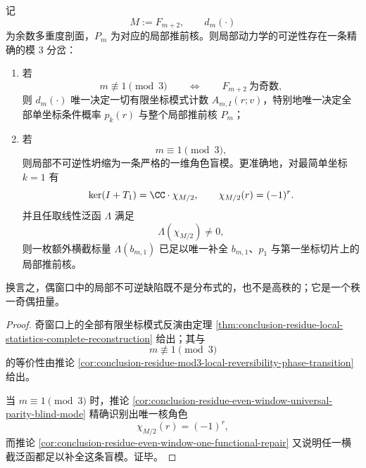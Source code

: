 \begin{theorem}[奇窗口全反演与偶窗口一维奇偶盲模]\label{thm:conclusion-oddwindow-full-inversion-evenwindow-rankone-parity-blindmode}
记
\[
M:=F_{m+2},
\qquad
d_m(\cdot)
\]
为余数多重度剖面，\(P_m\) 为对应的局部推前核。则局部动力学的可逆性存在一条精确的模 \(3\) 分岔：
\begin{enumerate}
  \item 若
  \[
  m\not\equiv 1\pmod 3
  \qquad\Longleftrightarrow\qquad
  F_{m+2}\ \text{为奇数},
  \]
  则 \(d_m(\cdot)\) 唯一决定一切有限坐标模式计数 \(A_{m,I}(r;v)\)，特别地唯一决定全部单坐标条件概率 \(p_k(r)\) 与整个局部推前核 \(P_m\)；
  \item 若
  \[
  m\equiv 1\pmod 3,
  \]
  则局部不可逆性坍缩为一条严格的一维角色盲模。更准确地，对最简单坐标 \(k=1\) 有
  \[
  \ker(I+T_1)=\CC\cdot \chi_{M/2},
  \qquad
  \chi_{M/2}(r)=(-1)^r.
  \]
  并且任取线性泛函 \(\Lambda\) 满足
  \[
  \Lambda(\chi_{M/2})\neq 0,
  \]
  则一枚额外横截标量 \(\Lambda(b_{m,1})\) 已足以唯一补全 \(b_{m,1}\)、\(p_1\) 与第一坐标切片上的局部推前核。
\end{enumerate}
换言之，偶窗口中的局部不可逆缺陷既不是分布式的，也不是高秩的；它是一个秩一奇偶扭量。
\end{theorem}
\begin{proof}
奇窗口上的全部有限坐标模式反演由定理 \ref{thm:conclusion-residue-local-statistics-complete-reconstruction} 给出；其与
\[
m\not\equiv 1\pmod 3
\]
的等价性由推论 \ref{cor:conclusion-residue-mod3-local-reversibility-phase-transition} 给出。

当 \(m\equiv 1\pmod 3\) 时，推论 \ref{cor:conclusion-residue-even-window-universal-parity-blind-mode} 精确识别出唯一核角色
\[
\chi_{M/2}(r)=(-1)^r,
\]
而推论 \ref{cor:conclusion-residue-even-window-one-functional-repair} 又说明任一横截泛函都足以补全这条盲模。证毕。
\end{proof}

